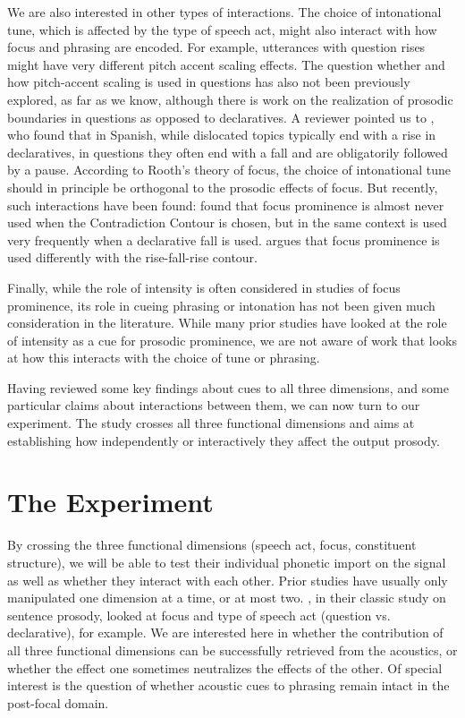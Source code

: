 \documentclass[preprint,review,12pt,authoryear,times]{elsarticle}
\begin{document}
We are also interested in other types of interactions. The choice of intonational tune, which is affected by the type of speech act, might also interact with how focus and phrasing are encoded. For example, utterances with question rises might have very different pitch accent scaling effects.  The question whether and how pitch-accent scaling is used in questions has also not been previously explored, as far as we know, although there is work on the realization of prosodic boundaries in questions as opposed to declaratives. A reviewer pointed us to \citet{feldh16}, who found that in Spanish, while dislocated topics typically end with a rise in declaratives, in questions they often end with a fall and are obligatorily followed by a pause.  According to Rooth's theory of focus, the choice of intonational tune should in principle be orthogonal to the prosodic effects of focus. But recently, such interactions have been found:  \citep{goodhueetal16} found that focus prominence is almost never used when the Contradiction Contour is chosen, but in the same context is used very frequently when a declarative fall is used. \citet{schlo18} argues that focus prominence is used differently with the rise-fall-rise contour. 

Finally, while the role of intensity is often considered in studies of focus prominence, its role in cueing phrasing or intonation has not been given much consideration in the literature. While many prior studies have looked at the role of intensity as a cue for prosodic prominence, we are not aware of work that looks at how this interacts with the choice of tune or phrasing. 

Having reviewed some key findings about cues to all three dimensions, and some particular claims about interactions between them, we can now turn to our experiment. The study crosses all three functional dimensions and aims at establishing how independently or interactively they affect the output prosody.


\section{The Experiment}
\label{experiment}

By crossing the three functional dimensions  (speech act, focus, constituent structure), we will be able to test their individual phonetic import on the signal as well as whether they interact with each other. Prior studies have usually only manipulated one dimension at a time, or at most two.  \citet{eady86}, in their classic study on sentence prosody, looked at focus and type of speech act (question vs. declarative), for example. We are interested here in whether the contribution of all three functional dimensions can be successfully retrieved from the acoustics, or whether the effect one sometimes neutralizes the effects of the other. Of special interest is the question of whether acoustic cues to phrasing remain intact in the post-focal domain. 
\end{document}
